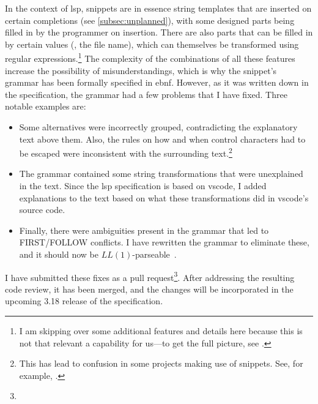 \documentclass[../thesis]{subfiles}
\begin{document}
In the context of \gls{lsp}, snippets are in essence string templates that are inserted on certain completions (see \cref{subsec:unplanned}), with some designed parts being filled in by the programmer on insertion.
There are also parts that can be filled in by certain values (\eg, the file name), which can themselves be transformed using regular expressions.\footnote{
	I am skipping over some additional features and details here because this is not that relevant a \gls{capability} for us---to get the full picture, see .
}
The complexity of the combinations of all these features increase the possibility of misunderstandings, which is why the snippet's grammar has been formally specified in \gls{ebnf}.
However, as it was written down in the specification, the grammar had a few problems that I have fixed.
Three notable examples are:
\begin{itemize}
	\item Some alternatives were incorrectly grouped, contradicting the explanatory text above them.
	      Also, the rules on how and when control characters had to be escaped were inconsistent with the surrounding text.\footnote{
		      This has lead to confusion in some projects making use of snippets.
		      See, for example, .
	      }
	\item The grammar contained some string transformations that were unexplained in the text.
	      Since the \gls{lsp} specification is based on \gls{vscode}, I added explanations to the text based on what these transformations did in \gls{vscode}'s source code.
	\item Finally, there were ambiguities present in the grammar that led to \textsf{FIRST}/\textsf{FOLLOW} conflicts.
	      I have rewritten the grammar to eliminate these, and it should now be $LL(1)$-parseable~\cite[222--224]{aho2007}.

\end{itemize}


I have submitted these fixes as a pull request\footnote{}.
After addressing the resulting code review, it has been merged, and the changes will be incorporated in the upcoming 3.18 release of the specification.
\end{document}
